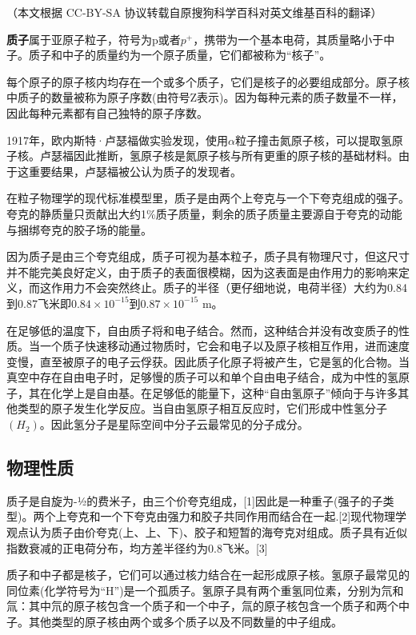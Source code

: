 
（本文根据 CC-BY-SA 协议转载自原搜狗科学百科对英文维基百科的翻译）


\textbf{质子}属于亚原子粒子，符号为p或者$p^+$，携带为一个基本电荷，其质量略小于中子。质子和中子的质量约为一个原子质量，它们都被称为“核子”。

每个原子的原子核内均存在一个或多个质子，它们是核子的必要组成部分。原子核中质子的数量被称为原子序数(由符号Z表示)。因为每种元素的质子数量不一样，因此每种元素都有自己独特的原子序数。

1917年，欧内斯特·卢瑟福做实验发现，使用$\alpha$粒子撞击氮原子核，可以提取氢原子核。卢瑟福因此推断，氢原子核是氮原子核与所有更重的原子核的基础材料。由于这重要结果，卢瑟福被公认为质子的发现者。

在粒子物理学的现代标准模型里，质子是由两个上夸克与一个下夸克组成的强子。夸克的静质量只贡献出大约1\%质子质量，剩余的质子质量主要源自于夸克的动能与捆绑夸克的胶子场的能量。

因为质子是由三个夸克组成，质子可视为基本粒子，质子具有物理尺寸，但这尺寸并不能完美良好定义，由于质子的表面很模糊，因为这表面是由作用力的影响来定义，而这作用力不会突然终止。质子的半径（更仔细地说，电荷半径）大约为0.84到0.87飞米即$0.84\times10^{-15}$到$0.87\times10^{-15}$ m。

在足够低的温度下，自由质子将和电子结合。然而，这种结合并没有改变质子的性质。当一个质子快速移动通过物质时，它会和电子以及原子核相互作用，进而速度变慢，直至被原子的电子云俘获。因此质子化原子将被产生，它是氢的化合物。当真空中存在自由电子时，足够慢的质子可以和单个自由电子结合，成为中性的氢原子，其在化学上是自由基。在足够低的能量下，这种“自由氢原子”倾向于与许多其他类型的原子发生化学反应。当自由氢原子相互反应时，它们形成中性氢分子$(H_2)$。因此氢分子是星际空间中分子云最常见的分子成分。

\subsection{物理性质}
质子是自旋为-½的费米子，由三个价夸克组成，[1]因此是一种重子(强子的子类型)。两个上夸克和一个下夸克由强力和胶子共同作用而结合在一起.[2]现代物理学观点认为质子由价夸克(上、上、下)、胶子和短暂的海夸克对组成。质子具有近似指数衰减的正电荷分布，均方差半径约为0.8飞米。[3]

质子和中子都是核子，它们可以通过核力结合在一起形成原子核。氢原子最常见的同位素(化学符号为“H”)是一个孤质子。氢原子具有两个重氢同位素，分别为氘和氚：其中氘的原子核包含一个质子和一个中子，氚的原子核包含一个质子和两个中子。其他类型的原子核由两个或多个质子以及不同数量的中子组成。

